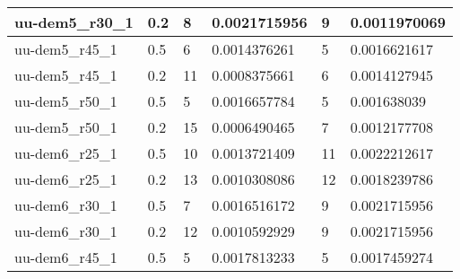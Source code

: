 \begin{table}[]
\begin{tabular}{|l|l|l|l|l|l|}
    uu-dem5\_r30\_1                                & 0.2                                         & 8                              & 0.0021715956                    & 9                              & 0.0011970069                    \\ \hline
    uu-dem5\_r45\_1                                & 0.5                                         & 6                              & 0.0014376261                    & 5                              & 0.0016621617                    \\ \hline
    uu-dem5\_r45\_1                                & 0.2                                         & 11                             & 0.0008375661                    & 6                              & 0.0014127945                    \\ \hline
    uu-dem5\_r50\_1                                & 0.5                                         & 5                              & 0.0016657784                    & 5                              & 0.001638039                     \\ \hline
    uu-dem5\_r50\_1                                & 0.2                                         & 15                             & 0.0006490465                    & 7                              & 0.0012177708                    \\ \hline
    uu-dem6\_r25\_1                                & 0.5                                         & 10                             & 0.0013721409                    & 11                             & 0.0022212617                    \\ \hline
    uu-dem6\_r25\_1                                & 0.2                                         & 13                             & 0.0010308086                    & 12                             & 0.0018239786                    \\ \hline
    uu-dem6\_r30\_1                                & 0.5                                         & 7                              & 0.0016516172                    & 9                              & 0.0021715956                    \\ \hline
    uu-dem6\_r30\_1                                & 0.2                                         & 12                             & 0.0010592929                    & 9                              & 0.0021715956                    \\ \hline
    uu-dem6\_r45\_1                                & 0.5                                         & 5                              & 0.0017813233                    & 5                              & 0.0017459274                    \\ \hline

\end{tabular}
\end{table}
